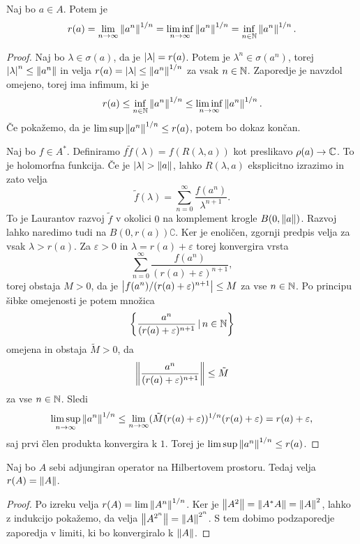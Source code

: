 \begin{izrek}
  Naj bo $a \in A$.
  Potem je
  \[
	r(a) = \lim_{n \to \infty} \left\lVert a^n\right\rVert^{1/n} = \liminf_{n \to \infty}
	\left\lVert a^n\right\rVert^{1/n}
	= \inf_{n \in \mathbb{N}} \left\lVert a^n\right\rVert^{1/n}.
  \]
\end{izrek}

\begin{proof}
  Naj bo $\lambda \in \sigma(a)$, da je $\left| \lambda \right| = r(a)$.
  Potem je $\lambda^n \in \sigma(a^n)$, torej $\left| \lambda \right|^n \le \left\lVert a^n\right\rVert$
  in velja $r(a) = \left| \lambda \right| \le \left\lVert a^n\right\rVert^{1/n}$ za vsak $n \in \mathbb{N}$.
  Zaporedje je navzdol omejeno, torej ima infimum, ki je
  \[
	r(a) \le \inf_{n \in \mathbb{N}} \left\lVert a^n\right\rVert^{1/n} \le \liminf_{n \to \infty}
	\left\lVert a^n\right\rVert^{1/n}.
  \]
  Če pokažemo, da je $\limsup \left\lVert a^n\right\rVert^{1/n} \le r(a)$, potem bo dokaz končan.

  Naj bo $f \in A^*$.
  Definiramo $f\tilde{f}(\lambda) = f(R(\lambda, a))$ kot preslikavo $\rho(a)
  \to \mathbb{C}$.
  To je holomorfna funkcija.
  Če je $\left| \lambda \right| > \left\lVert a\right\rVert$, lahko $R(\lambda, a)$ eksplicitno izrazimo
  in zato velja
  \[
	\tilde{f}(\lambda) = \sum_{n=0}^\infty \frac{f(a^n)}{\lambda^{n+1}}.
  \]
  To je Laurantov razvoj $\tilde{f}$ v okolici $0$ na komplement krogle $B(0,
  \left\lVert a\right\rVert)$.
  Razvoj lahko naredimo tudi na $B(0, r(a))\complement$.
  Ker je enoličen, zgornji predpis velja za vsak $\lambda > r(a)$.
  Za $\varepsilon > 0$ in $\lambda = r(a) + \varepsilon$ torej konvergira vrsta
  \[
	\sum_{n=0}^\infty \frac{f(a^n)}{(r(a) + \varepsilon)^{n+1}},
  \]
  torej obstaja $M > 0$, da je $\left| f(a^n) / (r(a) + \varepsilon)^{n+1} \right| \le M$
  za vse $n \in \mathbb{N}$.
  Po principu šibke omejenosti je potem množica
  \[
	\left\{ \frac{a^n}{(r(a) + \varepsilon)^{n+1}} \,|\, n \in \mathbb{N}\right\}
  \]
  omejena in obstaja $\tilde{M} > 0$, da
  \[
	\left\lVert\frac{a^n}{(r(a) + \varepsilon)^{n+1}}\right\rVert \le \tilde{M}
  \]
  za vse $n \in \mathbb{N}$.
  Sledi
  \[
	\limsup_{n \to \infty} \left\lVert a^n\right\rVert^{1/n} \le \lim_{n \to \infty} (\tilde{M}
	(r(a) + \varepsilon))^{1/n} (r(a) + \varepsilon)
	= r(a) + \varepsilon,
  \]
  saj prvi člen produkta konvergira k $1$.
  Torej je $\limsup \left\lVert a^n\right\rVert^{1/n} \le r(a)$.
\end{proof}

\begin{posledica}
  Naj bo $A$ sebi adjungiran operator na Hilbertovem prostoru.
  Tedaj velja $r(A) = \left\lVert A\right\rVert$.
\end{posledica}

\begin{proof}
  Po izreku velja $r(A) = \lim \left\lVert A^n\right\rVert^{1/n}$.
  Ker je $\left\lVert A^2\right\rVert = \left\lVert A^* A\right\rVert = \left\lVert A\right\rVert^2$, lahko z indukcijo pokažemo,
  da velja $\left\lVert A^{2^n}\right\rVert = \left\lVert A\right\rVert^{2^n}$.
  S tem dobimo podzaporedje zaporedja v limiti, ki bo konvergiralo k $\left\lVert A\right\rVert$.
\end{proof}

